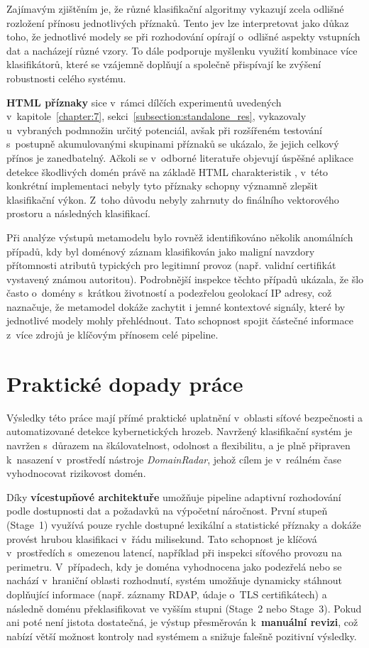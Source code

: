Zajímavým zjištěním je, že různé klasifikační algoritmy vykazují zcela odlišné rozložení přínosu jednotlivých příznaků. Tento jev lze interpretovat jako důkaz toho, že jednotlivé modely se při rozhodování opírají o~odlišné aspekty vstupních dat a nacházejí různé vzory. To dále podporuje myšlenku využití kombinace více klasifikátorů, které se vzájemně doplňují a společně přispívají ke zvýšení robustnosti celého systému.

\textbf{HTML příznaky} sice v~rámci dílčích experimentů uvedených v~kapitole~\ref{chapter:7}, sekci~\ref{subsection:standalone_res}, vykazovaly u~vybraných podmnožin určitý potenciál, avšak při rozšířeném testování s~postupně akumulovanými skupinami příznaků se ukázalo, že jejich celkový přínos je zanedbatelný. Ačkoli se v~odborné literatuře objevují úspěšné aplikace detekce škodlivých domén právě na základě HTML charakteristik \cite{mahmood2021html}, v~této konkrétní implementaci nebyly tyto příznaky schopny významně zlepšit klasifikační výkon. Z~toho důvodu nebyly zahrnuty do finálního vektorového prostoru a následných klasifikací.


Při analýze výstupů metamodelu bylo rovněž identifikováno několik anomálních případů, kdy byl doménový záznam klasifikován jako maligní navzdory přítomnosti atributů typických pro legitimní provoz (např. validní certifikát vystavený známou autoritou). Podrobnější inspekce těchto případů ukázala, že šlo často o~domény s~krátkou životností a podezřelou geolokací IP adresy, což naznačuje, že metamodel dokáže zachytit i jemné kontextové signály, které by jednotlivé modely mohly přehlédnout. Tato schopnost spojit částečné informace z~více zdrojů je klíčovým přínosem celé pipeline.



\section{Praktické dopady práce}
\label{sec:discussion-impact}

Výsledky této práce mají přímé praktické uplatnění v~oblasti síťové bezpečnosti a automatizované detekce kybernetických hrozeb. Navržený klasifikační systém je navržen s~důrazem na škálovatelnost, odolnost a flexibilitu, a je plně připraven k~nasazení v~prostředí nástroje \emph{DomainRadar}, jehož cílem je v~reálném čase vyhodnocovat rizikovost domén.

Díky \textbf{vícestupňové architektuře} umožňuje pipeline adaptivní rozhodování podle dostupnosti dat a požadavků na výpočetní náročnost. První stupeň (Stage~1) využívá pouze rychle dostupné lexikální a statistické příznaky a dokáže provést hrubou klasifikaci v~řádu milisekund. Tato schopnost je klíčová v~prostředích s~omezenou latencí, například při inspekci síťového provozu na perimetru. V~případech, kdy je doména vyhodnocena jako podezřelá nebo se nachází v~hraniční oblasti rozhodnutí, systém umožňuje dynamicky stáhnout doplňující informace (např. záznamy RDAP, údaje o~TLS certifikátech) a následně doménu překlasifikovat ve vyšším stupni (Stage~2 nebo Stage~3). Pokud ani poté není jistota dostatečná, je výstup přesměrován k~\textbf{manuální revizi}, což nabízí větší možnost kontroly nad systémem a snižuje falešně pozitivní výsledky. 

